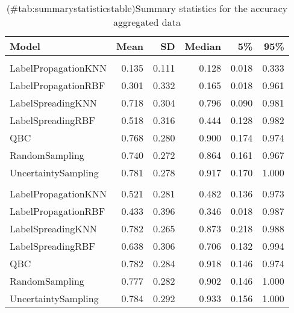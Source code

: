 \begin{table}[!h]

\caption{(\#tab:summarystatisticstable)Summary statistics for the accuracy aggregated data}
\centering
\begin{tabular}[t]{lrrrrr}
\toprule
Model & Mean & SD & Median & 5\% & 95\%\\
\midrule
\addlinespace[0.3em]
\multicolumn{6}{l}{\textbf{10\% missing labels}}\\
\hspace{1em}LabelPropagationKNN & 0.135 & 0.111 & 0.128 & 0.018 & 0.333\\
\hspace{1em}LabelPropagationRBF & 0.301 & 0.332 & 0.165 & 0.018 & 0.961\\
\hspace{1em}LabelSpreadingKNN & 0.718 & 0.304 & 0.796 & 0.090 & 0.981\\
\hspace{1em}LabelSpreadingRBF & 0.518 & 0.316 & 0.444 & 0.128 & 0.982\\
\hspace{1em}QBC & 0.768 & 0.280 & 0.900 & 0.174 & 0.974\\
\hspace{1em}RandomSampling & 0.740 & 0.272 & 0.864 & 0.161 & 0.967\\
\hspace{1em}UncertaintySampling & 0.781 & 0.278 & 0.917 & 0.170 & 1.000\\
\addlinespace[0.3em]
\multicolumn{6}{l}{\textbf{50\% missing labels}}\\
\hspace{1em}LabelPropagationKNN & 0.521 & 0.281 & 0.482 & 0.136 & 0.973\\
\hspace{1em}LabelPropagationRBF & 0.433 & 0.396 & 0.346 & 0.018 & 0.987\\
\hspace{1em}LabelSpreadingKNN & 0.782 & 0.265 & 0.873 & 0.218 & 0.988\\
\hspace{1em}LabelSpreadingRBF & 0.638 & 0.306 & 0.706 & 0.132 & 0.994\\
\hspace{1em}QBC & 0.782 & 0.284 & 0.918 & 0.146 & 0.974\\
\hspace{1em}RandomSampling & 0.777 & 0.282 & 0.902 & 0.146 & 1.000\\
\hspace{1em}UncertaintySampling & 0.784 & 0.292 & 0.933 & 0.156 & 1.000\\
\bottomrule
\end{tabular}
\end{table}
